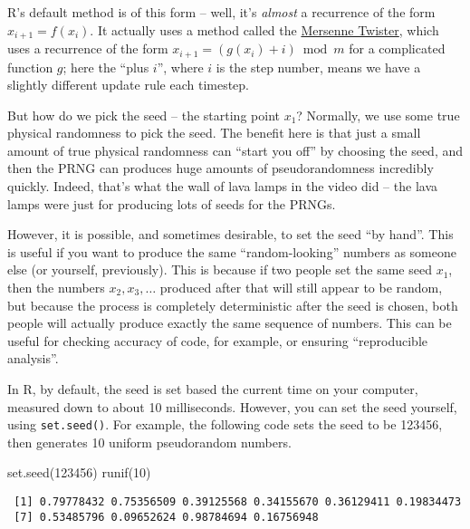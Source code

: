 \documentclass[
  letterpaper,
  DIV=11,
  numbers=noendperiod]{scrreprt}
\newenvironment{Shaded}{\begin{snugshade}}{\end{snugshade}}
\newcommand{\DecValTok}[1]{\textcolor[rgb]{0.68,0.00,0.00}{#1}}
\newcommand{\FunctionTok}[1]{\textcolor[rgb]{0.28,0.35,0.67}{#1}}
\newcommand{\NormalTok}[1]{\textcolor[rgb]{0.00,0.23,0.31}{#1}}
\theoremstyle{plain}
\theoremstyle{definition}
\theoremstyle{definition}
\theoremstyle{remark}
\begin{document}
R's default method is of this form -- well, it's \emph{almost} a
recurrence of the form \(x_{i+1} = f(x_i)\). It actually uses a method
called the
\href{https://en.wikipedia.org/wiki/Mersenne_Twister}{Mersenne Twister},
which uses a recurrence of the form \(x_{i+1} = (g(x_i) + i) \bmod m\)
for a complicated function \(g\); here the ``plus \(i\)'', where \(i\)
is the step number, means we have a slightly different update rule each
timestep.

But how do we pick the seed -- the starting point \(x_1\)? Normally, we
use some true physical randomness to pick the seed. The benefit here is
that just a small amount of true physical randomness can ``start you
off'' by choosing the seed, and then the PRNG can produces huge amounts
of pseudorandomness incredibly quickly. Indeed, that's what the wall of
lava lamps in the video did -- the lava lamps were just for producing
lots of seeds for the PRNGs.

However, it is possible, and sometimes desirable, to set the seed ``by
hand''. This is useful if you want to produce the same
``random-looking'' numbers as someone else (or yourself, previously).
This is because if two people set the same seed \(x_1\), then the
numbers \(x_2, x_3, \dots\) produced after that will still appear to be
random, but because the process is completely deterministic after the
seed is chosen, both people will actually produce exactly the same
sequence of numbers. This can be useful for checking accuracy of code,
for example, or ensuring ``reproducible analysis''.

In R, by default, the seed is set based the current time on your
computer, measured down to about 10 milliseconds. However, you can set
the seed yourself, using \texttt{set.seed()}. For example, the following
code sets the seed to be 123456, then generates 10 uniform pseudorandom
numbers.

\begin{Shaded}
\begin{Highlighting}[]
\FunctionTok{set.seed}\NormalTok{(}\DecValTok{123456}\NormalTok{)}
\FunctionTok{runif}\NormalTok{(}\DecValTok{10}\NormalTok{)}
\end{Highlighting}
\end{Shaded}

\begin{verbatim}
 [1] 0.79778432 0.75356509 0.39125568 0.34155670 0.36129411 0.19834473
 [7] 0.53485796 0.09652624 0.98784694 0.16756948
\end{verbatim}
\end{document}
